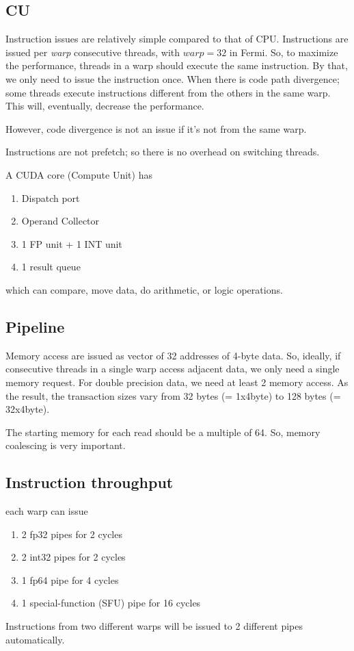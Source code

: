 \subsection{CU}
\label{sec:cu}

Instruction issues are relatively simple compared to that of CPU. Instructions
are issued per {\it warp} consecutive threads, with $warp=32$ in Fermi. So, to
maximize the performance, threads in a warp should execute the same instruction.
By that, we only need to issue the instruction once. When there is code path
divergence; some threads execute instructions different from the others in the
same warp. This will, eventually, decrease the performance.

However, code divergence is not an issue if it's not from the same
warp. 

Instructions are not prefetch; so there is no overhead on switching
threads. 

A CUDA core (Compute Unit) has 
\begin{enumerate}
  \item Dispatch port
  \item Operand Collector
  \item 1 FP unit + 1 INT unit
  \item 1 result queue
\end{enumerate}
which can compare, move data, do arithmetic, or logic operations. 



\subsection{Pipeline}
\label{sec:pipeline}

Memory access are issued as vector of 32 addresses of 4-byte data. So,
ideally, if consecutive threads in a single warp access adjacent data,
we only need a single memory request. For double precision data, we
need at least 2 memory access. As the result, the transaction sizes
vary from 32 bytes (= 1x4byte) to 128 bytes (= 32x4byte).

The starting memory for each read should be a multiple of 64. So,
memory coalescing is very important. 

\subsection{Instruction throughput}
\label{sec:instr-thro}

each warp can issue
\begin{enumerate}
\item  2 fp32 pipes for 2 cycles
\item  2 int32 pipes for 2 cycles
\item 1 fp64 pipe for 4 cycles
\item 1 special-function (SFU) pipe for 16 cycles
\end{enumerate}
Instructions from two different warps will be issued to 2 different
pipes automatically. 


